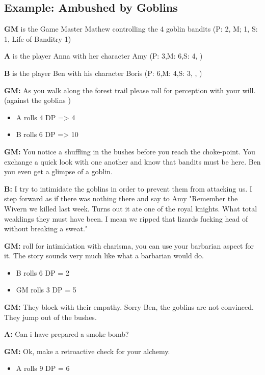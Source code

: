 \documentclass[11pt]{article}
\begin{document}
{\subsection{Example: Ambushed by Goblins}
\label{sec:org8a86dbd}

\textbf{GM} is the Game Master Mathew controlling the 4 goblin bandits (P: 2, M; 1, S: 1, Life of Banditry 1)

\textbf{A} is the player Anna with her character Amy (P: 3,M: 6,S: 4, )

\textbf{B} is the player Ben with his character Boris (P: 6,M: 4,S: 3, , )

\textbf{GM:} As you walk along the forest trail please roll for perception with your will. (against the goblins ) 
\begin{itemize}
\item A rolls 4 DP => 4
\item B rolls 6 DP => 10
\end{itemize}

\textbf{GM:} You notice a shuffling in the bushes before you reach the choke-point. You exchange a quick look with one another and know that bandits must be here. Ben you even get a glimpse of a goblin.

\textbf{B:} I try to intimidate the goblins in order to prevent them from attacking us. I step forward as if there was nothing there and say to Amy "Remember the Wivern we killed last week. Turns out it ate one of the royal knights. What total weaklings they must have been. I mean we ripped that lizards fucking head of without breaking a sweat."

\textbf{GM:} roll for intimidation with charisma, you can use your barbarian aspect for it. The story sounds very much like what a barbarian would do.
\begin{itemize}
\item B rolls 6 DP = 2
\item GM rolls 3 DP = 5
\end{itemize}

\textbf{GM:} They block with their empathy. Sorry Ben, the goblins are not convinced. They jump out of the bushes.

\textbf{A:} Can i have prepared a smoke bomb?

\textbf{GM:} Ok, make a retroactive check for your alchemy.
\begin{itemize}
\item A rolls 9 DP = 6
\end{itemize}

}
\end{document}
